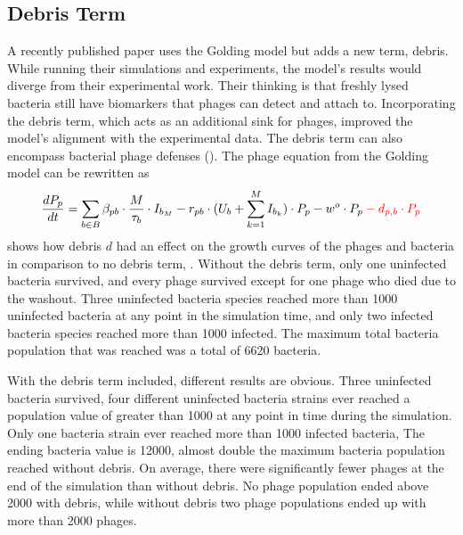 \subsection{Debris Term}
\label{sec:discussion:debris}
A recently published paper \citet{deyEmergentHigherorderInteractions2025} uses the Golding model but adds a new term, debris. While running their simulations and experiments, the model's results would diverge from their experimental work. 
Their thinking is that freshly lysed bacteria still have biomarkers that phages can detect and attach to. 
Incorporating the debris term, which acts as an additional sink for phages, improved the model's alignment with the experimental data.
The debris term can also encompass bacterial phage defenses (). 
The phage equation from the Golding model can be rewritten as 
\[
    \frac{dP_p}{dt} = \sum_{b\in B}\beta_{p b}\cdot\frac{M}{\tau_b} \cdot I_{b_M} - r_{p b}\cdot(U_b + \sum_{k=1}^{M} I_{b_k})\cdot P_p - w^o \cdot P_p \mathcolor{red}{- d_{p, b} \cdot P_p}
\]
 shows how debris $d$ had an effect on the growth curves of the phages and bacteria in comparison to no debris term, . 
Without the debris term, only one uninfected bacteria survived, and every phage survived except for one phage who died due to the washout. 
Three uninfected bacteria species reached more than 1000 uninfected bacteria at any point in the simulation time, and only two infected bacteria species reached more than 1000 infected. 
The maximum total bacteria population that was reached was a total of 6620 bacteria. 

With the debris term included, different results are obvious. 
Three uninfected bacteria survived, four different uninfected bacteria strains ever reached a population value of greater than 1000 at any point in time during the simulation. 
Only one bacteria strain ever reached more than 1000 infected bacteria, 
The ending bacteria value is 12000, almost double the maximum bacteria population reached without debris. 
On average, there were significantly fewer phages at the end of the simulation than without debris. 
No phage population ended above 2000 with debris, while without debris two phage populations ended up with more than 2000 phages. 

